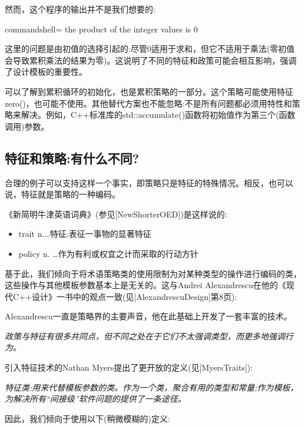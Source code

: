 然而，这个程序的输出并不是我们想要的:

\begin{tcblisting}{commandshell={}}
the product of the integer values is 0
\end{tcblisting}

这里的问题是由初值的选择引起的:尽管0适用于求和，但它不适用于乘法(零初值会导致累积乘法的结果为零)。这说明了不同的特征和政策可能会相互影响，强调了设计模板的重要性。

可以了解到累积循环的初始化，也是累积策略的一部分。这个策略可能使用特征zero()，也可能不使用。其他替代方案也不能忽略:不是所有问题都必须用特性和策略来解决。例如，C++标准库的std::accumulate()函数将初始值作为第三个(函数调用)参数。

\subsection{特征和策略:有什么不同?}

合理的例子可以支持这样一个事实，即策略只是特征的特殊情况。相反，也可以说，特征就是策略的一种编码。

《新简明牛津英语词典》(参见[NewShorterOED])是这样说的:

\begin{itemize}
\item 
trait n.…特征:表征一事物的显著特征

\item 
policy n. …作为有利或权宜之计而采取的行动方针
\end{itemize}

基于此，我们倾向于将术语策略类的使用限制为对某种类型的操作进行编码的类，这些操作与其他模板参数基本上是无关的。这与Andrei Alexandrescu在他的《现代C++设计》一书中的观点一致(见[AlexandrescuDesign]第8页):

\begin{tcolorbox}[colback=webgreen!5!white,colframe=webgreen!75!black]
\hspace*{0.75cm}Alexandrescu一直是策略界的主要声音，他在此基础上开发了一套丰富的技术。
\end{tcolorbox}

\textit{政策与特征有很多共同点，但不同之处在于它们不太强调类型，而更多地强调行为。}

引入特征技术的Nathan Myers提出了更开放的定义(见[MyersTraits]):

\textit{特征类:用来代替模板参数的类。作为一个类，聚合有用的类型和常量;作为模板，为解决所有“间接级”软件问题的提供了一条途径。}

因此，我们倾向于使用以下(稍微模糊的)定义:

